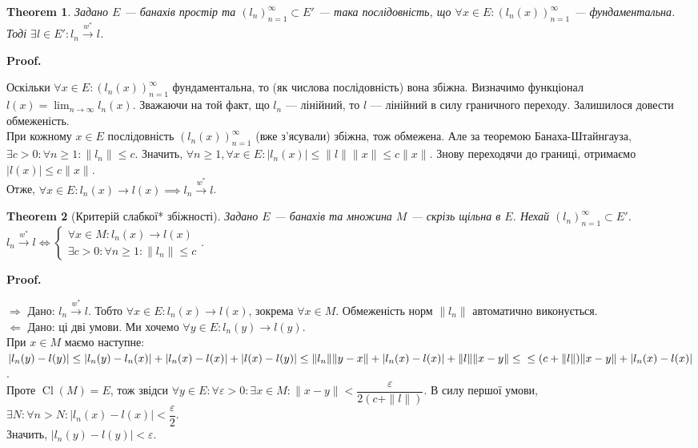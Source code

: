 \documentclass[a4paper, 10pt]{article}
\makeatletter
\def\rightproof{$\boxed{\Rightarrow}$ }
\def\leftproof{$\boxed{\Leftarrow}$ }
\theoremstyle{theoremdd}
\newtheorem{theorem}{Theorem}[subsection]
\theoremstyle{theoremdd}
\theoremstyle{theoremdd}
\theoremstyle{theoremdd}
\theoremstyle{theoremdd}
\theoremstyle{theoremdd}
\theoremstyle{theoremdd}
\theoremstyle{theoremdd}
\newcommand{\toweakstar}{\overset{w^*}{\to}}
\renewenvironment{proof}[1][Proof.\\]{\par
\pushQED{\hfill \qed}%
\normalfont \topsep6\p@\@plus6\p@\relax
\trivlist
\item\relax
{\bfseries
#1\@addpunct{.}}\hspace\labelsep\ignorespaces
}{%
\popQED\endtrivlist\@endpefalse
}
\DeclareMathOperator{\Cl}{Cl}
\makeatother
\begin{document}
\begin{theorem}
Задано $E$ --- банахів простір та $(l_n)_{n=1}^\infty \subset E'$ --- така послідовність, що $\forall x \in E: (l_n(x))_{n=1}^\infty$ --- фундаментальна. Тоді $\exists l \in E': l_n \toweakstar l$.
\end{theorem}

\begin{proof}
Оскільки $\forall x \in E: (l_n(x))_{n=1}^\infty$ фундаментальна, то (як числова послідовність) вона збіжна. Визначимо функціонал $l(x) = \displaystyle\lim_{n \to \infty} l_n(x)$. Зважаючи на той факт, що $l_n$ --- лінійний, то $l$ --- лінійний в силу граничного переходу. Залишилося довести обмеженість.\\
При кожному $x \in E$ послідовність $(l_n(x))_{n=1}^\infty$ (вже з'ясували) збіжна, тож обмежена. Але за теоремою Банаха-Штайнгауза, $\exists c > 0: \forall n \geq 1: \|l_n\| \leq c$. Значить, $\forall n \geq 1, \forall x \in E: |l_n(x)| \leq \|l\| \|x\| \leq c \|x\|$. Знову переходячи до границі, отримаємо $|l(x)| \leq c \|x\|$.\\
Отже, $\forall x \in E: l_n(x) \to l(x) \implies l_n \toweakstar l$. 
\end{proof}

\begin{theorem}[Критерій слабкої* збіжності]
Задано $E$ --- банахів та множина $M$ --- скрізь щільна в $E$. Нехай $(l_n)_{n=1}^\infty \subset E'$.\\
$l_n \toweakstar l \iff \begin{cases} \forall x \in M: l_n(x) \to l(x) \\ \exists c > 0: \forall n \geq 1: \|l_n\| \leq c \end{cases}$.
\end{theorem}

\begin{proof}
\rightproof Дано: $l_n \toweakstar l$. Тобто $\forall x \in E: l_n(x) \to l(x)$, зокрема $\forall x \in M$. Обмеженість норм $\|l_n\|$ автоматично виконується.
\bigskip \\
\leftproof Дано: ці дві умови. Ми хочемо $\forall y \in E: l_n(y) \to l(y)$.\\
При $x \in M$ маємо наступне:\\
$|l_n(y) - l(y)| \leq |l_n(y) - l_n(x)| + |l_n(x) - l(x)| + |l(x) - l(y)| \leq \| l_n \| \| y - x \| + |l_n(x) - l(x)| + \|l\| \|x-y\| \leq \\
\leq (c + \|l\|) \|x-y\| + |l_n(x) - l(x)|$.\\
Проте $\Cl(M) = E$, тож звідси $\forall y \in E: \forall \varepsilon > 0: \exists x \in M: \|x-y\| < \dfrac{\varepsilon}{2(c+ \|l\|)}$. В силу першої умови, $\exists N: \forall n > N: |l_n(x) - l(x)| < \dfrac{\varepsilon}{2}$.\\
Значить, $|l_n(y) - l(y)| < \varepsilon$.
\end{proof}
\end{document}
